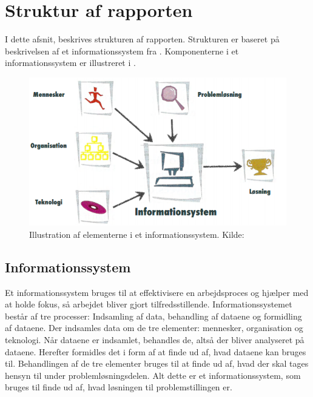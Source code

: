 \section{Struktur af rapporten}\label{sec:struktur-af-problemanalyse}

I dette afsnit, beskrives strukturen af rapporten. Strukturen er baseret på beskrivelsen af et
informationssystem fra \citet{Laudon1999}. Komponenterne i et informationssystem er illustreret i
.

\begin{figure}[htbp]
  \centering
  \includegraphics{images/kontekstmodel/metode.png}
  \caption[Metode for Kontekstmodellen]{Illustration af elementerne i et informationssystem. Kilde:
  \protect\citet{Laudon1999}}
  \label{fig:kontekstmodel}
\end{figure}


\subsection{Informationssystem}\label{subsec:Informationssystem}

Et informationssystem bruges til at effektivisere en arbejdsproces og hjælper med at holde fokus, så arbejdet
bliver gjort tilfredsstillende. Informationssystemet består af tre processer: Indsamling af data, behandling
af dataene og formidling af dataene. Der indsamles data om de tre elementer: mennesker, organisation og
teknologi. Når dataene er indsamlet, behandles de, altså der bliver analyseret på dataene. Herefter formidles
det i form af at finde ud af, hvad dataene kan bruges til. Behandlingen af de tre elementer bruges til at
finde ud af, hvad der skal tages hensyn til under problemløsningsdelen. Alt dette er et informationssystem,
som bruges til finde ud af, hvad løsningen til problemstillingen er.



